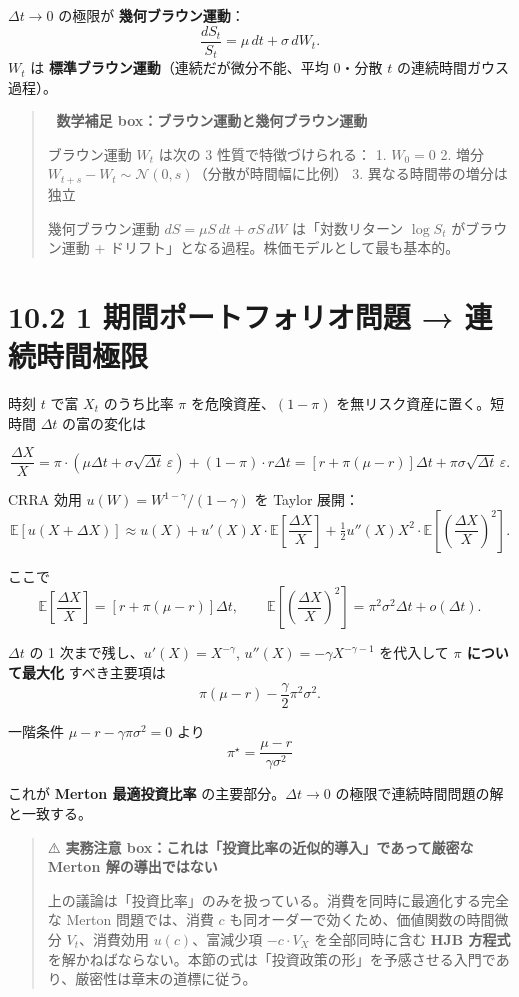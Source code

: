 \documentclass[11pt,a4paper]{report}
\begin{document}
$\Delta t \to 0$ の極限が \textbf{幾何ブラウン運動}： \[ \frac{dS_t}{S_t} = \mu\, dt + \sigma\, dW_t. \] $W_t$ は \textbf{標準ブラウン運動}（連続だが微分不能、平均 0・分散 $t$ の連続時間ガウス過程）。

\begin{quote}
📐 \textbf{数学補足 box：ブラウン運動と幾何ブラウン運動}

ブラウン運動 $W_t$ は次の 3 性質で特徴づけられる：
1. $W_0 = 0$
2. 増分 $W_{t+s} - W_t \sim \mathcal{N}(0, s)$（分散が時間幅に比例）
3. 異なる時間帯の増分は独立

幾何ブラウン運動 $dS = \mu S\, dt + \sigma S\, dW$ は「対数リターン $\log S_t$ がブラウン運動 + ドリフト」となる過程。株価モデルとして最も基本的。
\end{quote}

\section{10.2 1 期間ポートフォリオ問題 → 連続時間極限}

時刻 $t$ で富 $X_t$ のうち比率 $\pi$ を危険資産、$(1-\pi)$ を無リスク資産に置く。短時間 $\Delta t$ の富の変化は

\[ \frac{\Delta X}{X} = \pi \cdot (\mu \Delta t + \sigma \sqrt{\Delta t}\, \varepsilon) + (1 - \pi) \cdot r \Delta t = [r + \pi(\mu - r)] \Delta t + \pi \sigma \sqrt{\Delta t}\, \varepsilon. \]

CRRA 効用 $u(W) = W^{1-\gamma}/(1-\gamma)$ を Taylor 展開： \[ \mathbb{E}[u(X + \Delta X)] \approx u(X) + u'(X) X \cdot \mathbb{E}\!\left[\frac{\Delta X}{X}\right] + \tfrac{1}{2} u''(X) X^2 \cdot \mathbb{E}\!\left[\left(\frac{\Delta X}{X}\right)^2\right]. \]

ここで \[ \mathbb{E}\!\left[\frac{\Delta X}{X}\right] = [r + \pi(\mu - r)] \Delta t, \qquad \mathbb{E}\!\left[\left(\frac{\Delta X}{X}\right)^2\right] = \pi^2 \sigma^2 \Delta t + o(\Delta t). \]

$\Delta t$ の 1 次まで残し、$u'(X) = X^{-\gamma}$, $u''(X) = -\gamma X^{-\gamma - 1}$ を代入して \textbf{$\pi$ について最大化} すべき主要項は \[ \pi (\mu - r) - \frac{\gamma}{2} \pi^2 \sigma^2. \]

一階条件 $\mu - r - \gamma \pi \sigma^2 = 0$ より \[ \boxed{\;\pi^\star = \frac{\mu - r}{\gamma \sigma^2}\;} \]

これが \textbf{Merton 最適投資比率} の主要部分。$\Delta t \to 0$ の極限で連続時間問題の解と一致する。

\begin{quote}
⚠️ \textbf{実務注意 box：これは「投資比率の近似的導入」であって厳密な Merton 解の導出ではない}

上の議論は「投資比率」のみを扱っている。消費を同時に最適化する完全な Merton 問題では、消費 $c$ も同オーダーで効くため、価値関数の時間微分 $V_t$、消費効用 $u(c)$、富減少項 $-c \cdot V_X$ を全部同時に含む \textbf{HJB 方程式} を解かねばならない。本節の式は「投資政策の形」を予感させる入門であり、厳密性は章末の道標に従う。
\end{quote}
\end{document}
